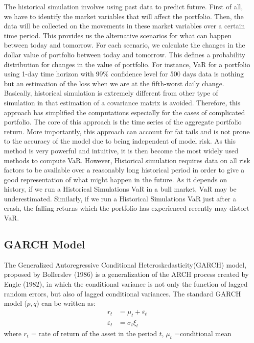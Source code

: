\documentclass[a4paper,11pt,oneside]{book}
\begin{document}
The historical simulation involves using past data to predict future. First of all, we
have to identify the market variables that will affect the portfolio. Then, the data
will be collected on the movements in these market variables over a certain time
period. This provides us the alternative scenarios for what can happen between
today and tomorrow. For each scenario, we calculate the changes in the dollar
value of portfolio between today and tomorrow. This defines a probability
distribution for changes in the value of portfolio. For instance, VaR for a portfolio
using 1-day time horizon with 99\% confidence level for 500 days data is nothing
but an estimation of the loss when we are at the fifth-worst daily change.
\newline\newline Basically, historical simulation is extremely different from other type of
simulation in that estimation of a covariance matrix is avoided. Therefore, this approach has simplified the computations especially for the cases of complicated
portfolio.\newline\newline
The core of this approach is the time series of the aggregate portfolio return. More
importantly, this approach can account for fat tails and is not prone to the
accuracy of the model due to being independent of model risk. As this method is
very powerful and intuitive, it is then become the most widely used methods to
compute VaR. However, Historical simulation requires data on all risk factors to be available over a reasonably long historical period in order to give a good
representation of what might happen in the future. As it depends on history, if we run a Historical Simulations VaR in a bull market, VaR may be underestimated. Similarly, if we run a Historical Simulations VaR just after a crash, the falling returns which the portfolio has experienced recently may distort VaR.
\subsection{GARCH Model}
The Generalized Autoregressive Conditional Heteroskedasticity(GARCH) model, proposed by Bollerslev
(1986) is a generalization of the ARCH process created by
Engle (1982), in which the conditional variance is not only
the function of lagged random errors, but also of lagged
conditional variances. The standard GARCH model ($p,q$)
can be written as:
\begin{equation}
\begin{aligned}
r_t &= \mu_t + \varepsilon_t
\\
\varepsilon_t &= \sigma_t \xi_t 
\label{6}
\end{aligned}
\end{equation}
where $r_t$ = rate of return of the asset in the period $t$,\newline
$\mu_t$ =conditional mean \newline
\end{document}
